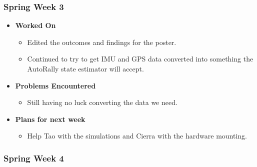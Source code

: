 \documentclass{article}
\begin{document}
\subsubsection{Spring Week 3}
\begin{itemize}
    \item {\textbf{Worked On}}
    \begin{itemize}
        \item Edited the outcomes and findings for the poster.
        \item Continued to try to get IMU and GPS data converted into something the AutoRally state estimator will accept.
    \end{itemize}

    \item {\textbf{Problems Encountered}}
    \begin{itemize}
        \item Still having no luck converting the data we need.
    \end{itemize}

    \item{\textbf{Plans for next week}}
    \begin{itemize}
        \item Help Tao with the simulations and Cierra with the hardware mounting.
    \end{itemize}
\end{itemize}

\subsubsection{Spring Week 4}
\end{document}
